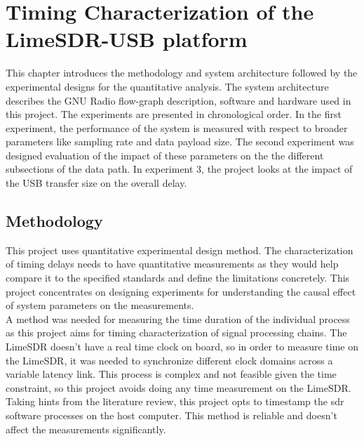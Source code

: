 \chapter{Timing Characterization of the LimeSDR-USB platform}
This chapter introduces the methodology and system architecture followed by the experimental designs for the quantitative analysis.
The system architecture describes the GNU Radio flow-graph description, software and hardware used in this project. The experiments are presented in chronological order. In the first experiment, the performance of the system is measured with respect to broader parameters like sampling rate and data payload size. The second experiment was designed evaluation of the impact of these parameters on the the different subsections of the data path. In experiment 3, the project looks at the impact of the USB transfer size on the overall delay.

\section{Methodology}
This project uses quantitative experimental design method.
The characterization of timing delays needs to have quantitative measurements as they would help compare it to the specified standards and define the limitations concretely.
This project concentrates on designing experiments for understanding the causal effect of system parameters on the measurements.\\

A method was needed for measuring the time duration of the individual process as this project aims for timing characterization of signal processing chains.
The LimeSDR doesn't have a real time clock on board, so in order to measure time on the LimeSDR, it was needed to synchronize different clock domains across a variable latency link.
This process is complex and not feasible given the time constraint, so this project avoids doing any time measurement on the LimeSDR.
Taking hints from the literature review, this project opts to timestamp the \ac{sdr} software processes on the host computer.
This method is reliable and doesn't affect the measurements significantly.\\

